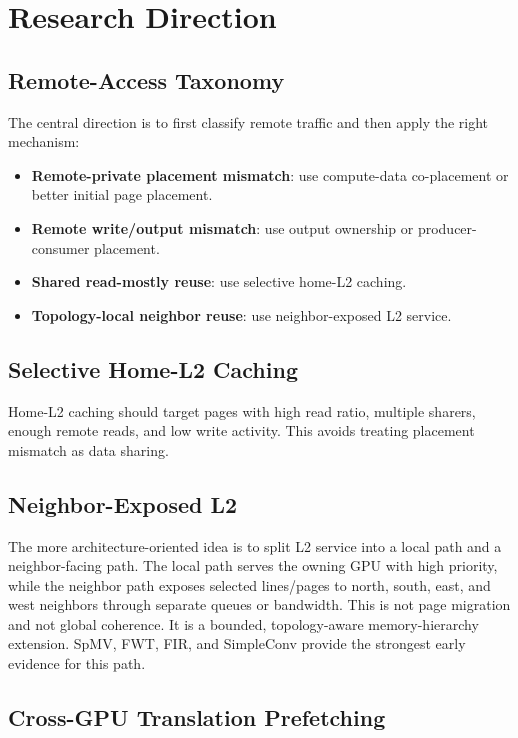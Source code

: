 \documentclass[sigconf,screen,review,anonymous]{acmart}
\begin{document}
\section{Research Direction}

\subsection{Remote-Access Taxonomy}

The central direction is to first classify remote traffic and then apply the
right mechanism:

\begin{itemize}
  \item \textbf{Remote-private placement mismatch}: use compute-data
  co-placement or better initial page placement.
  \item \textbf{Remote write/output mismatch}: use output ownership or
  producer-consumer placement.
  \item \textbf{Shared read-mostly reuse}: use selective home-L2 caching.
  \item \textbf{Topology-local neighbor reuse}: use neighbor-exposed L2 service.
\end{itemize}

\subsection{Selective Home-L2 Caching}

Home-L2 caching should target pages with high read ratio, multiple sharers,
enough remote reads, and low write activity.  This avoids treating placement
mismatch as data sharing.

\subsection{Neighbor-Exposed L2}

The more architecture-oriented idea is to split L2 service into a local path and
a neighbor-facing path.  The local path serves the owning GPU with high
priority, while the neighbor path exposes selected lines/pages to north, south,
east, and west neighbors through separate queues or bandwidth.  This is not page
migration and not global coherence.  It is a bounded, topology-aware
memory-hierarchy extension.  SpMV, FWT, FIR, and SimpleConv provide the strongest
early evidence for this path.

\subsection{Cross-GPU Translation Prefetching}
\end{document}
